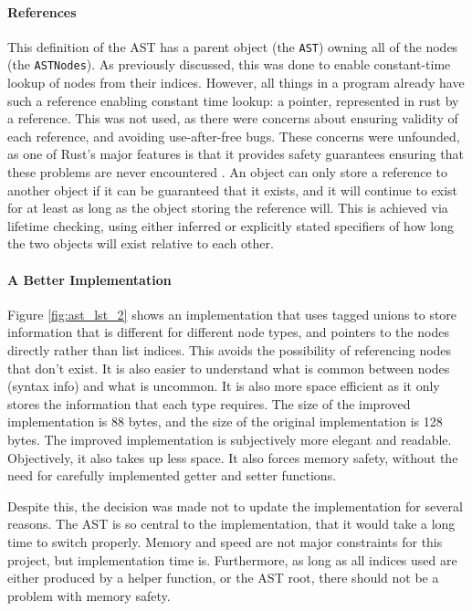 \paragraph{References}
This definition of the \ac{AST} has a parent object (the \verb|AST|) owning all of the nodes (the \verb|ASTNodes|). As previously discussed, this was done to enable constant-time lookup of nodes from their indices. However, all things in a program already have such a reference enabling constant time lookup: a pointer, represented in rust by a reference. This was not used, as there were concerns about ensuring validity of each reference, and avoiding use-after-free bugs. These concerns were unfounded, as one of Rust's major features is that it provides safety guarantees ensuring that these problems are never encountered \cite{rust_book}. An object can only store a reference to another object if it can be guaranteed that it exists, and it will continue to exist for at least as long as the object storing the reference will. This is achieved via lifetime checking, using either inferred or explicitly stated specifiers of how long the two objects will exist relative to each other. 

\paragraph{A Better Implementation}
Figure \ref{fig:ast_lst_2} shows an implementation that uses tagged unions to store information that is different for different node types, and pointers to the nodes directly rather than list indices. This avoids the possibility of referencing nodes that don't exist. It is also easier to understand what is common between nodes (syntax info) and what is uncommon. It is also more space efficient as it only stores the information that each type requires. The size of the improved implementation is 88 bytes, and the size of the original implementation is 128 bytes. The improved implementation is subjectively more elegant and readable. Objectively, it also takes up less space. It also forces memory safety, without the need for carefully implemented getter and setter functions. 

Despite this, the decision was made not to update the implementation for several reasons. The \ac{AST} is so central to the implementation, that it would take a long time to switch properly. Memory and speed are not major constraints for this project, but implementation time is. Furthermore, as long as all indices used are either produced by a helper function, or the \ac{AST} root, there should not be a problem with memory safety. 

